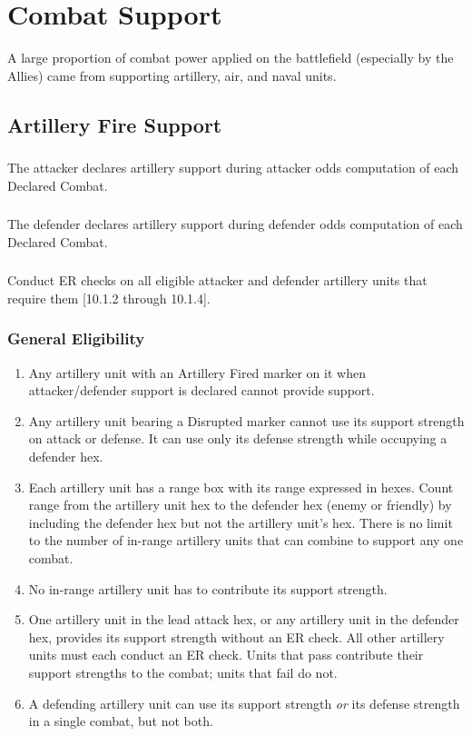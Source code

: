 \section{Combat Support}
A large proportion of combat power applied on the battlefield (especially by the Allies) came from supporting artillery, air, and naval units.

\subsection{Artillery Fire Support}

\subsubsection{}
The attacker declares artillery support during attacker odds computation of each Declared Combat.

\subsubsection{}
The defender declares artillery support during defender odds computation of each Declared Combat.

\subsubsection{}
Conduct ER checks on all eligible attacker and defender artillery units that require them [10.1.2 through 10.1.4].

\subsubsection{\textbf{General Eligibility}}

\begin{enumerate}[label=\alph*.]
    \item Any artillery unit with an Artillery Fired marker on it when attacker/defender support is declared cannot provide support.
    \item Any artillery unit bearing a Disrupted marker cannot use its support strength on attack or defense. It can use only its defense strength while occupying a defender hex.
    \item Each artillery unit has a range box with its range expressed in hexes. Count range from the artillery unit hex to the defender hex (enemy or friendly) by including the defender hex but not the artillery unit's hex. There is no limit to the number of in-range artillery units that can combine to support any one combat.
    \item No in-range artillery unit has to contribute its support strength.
    \item One artillery unit in the lead attack hex, or any artillery unit in the defender hex, provides its support strength without an ER check. All other artillery units must each conduct an ER check. Units that pass contribute their support strengths to the combat; units that fail do not.
    \item A defending artillery unit can use its support strength \textit{or} its defense strength in a single combat, but not both.
\end{enumerate}

